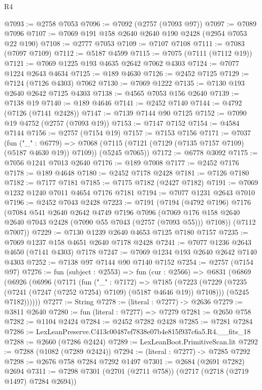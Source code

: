 \begin{lexlean}{R4}
\begin{coremodule}
@7093 := @2758 @7053
@7096 := @7092 (@2757 (@7093 @97))
@7097 := @7089 @7096
@7107 := @7069 @191 @158 @2640 @2640 @190 @2428 (@2954 @7053 @22 @190)
@7108 := @2777 @7053
@7109 := @7107 @7108
@7111 := @7083 (@7097 @7109)
@7112 := @5187 @4599
@7115 := @7075 (@7111 (@7112 @19))
@7121 := @7069 @1225 @193 @4635 @2642 @7062 @4303
@7124 := @7077 @1224 @2643 @4634
@7125 := @189 @4630
@7126 := @2452 @7125
@7129 := @7124 (@7126 @4303) @7062
@7130 := @7069 @1222
@7135 := @7130 @193 @2640 @2642 @7125 @4303
@7138 := @4565 @7053 @156 @2640
@7139 := @7138 @19
@7140 := @189 @4646
@7141 := @2452 @7140
@7144 := @4792 (@7126 (@7141 @2428))
@7147 := @7139 @7144 @90 @7125
@7152 := @7090 @19 @4752 (@2757 (@7093 @19))
@7153 := @7147 @7152
@7154 := @4584 @7144
@7156 := @2757 (@7154 @19)
@7157 := @7153 @7156
@7171 := @7037
    (fun ("_" : @6779) =>
    @7068 (@7115 (@7121 (@7129 (@7135 @7157 @7109) (@5187 @4630 @19)) @7109)) (@5245 @7065))
@7172 := @6778 @3092
@7175 := @7056 @1241 @7013 @2640
@7176 := @189 @7008
@7177 := @2452 @7176
@7178 := @189 @4648
@7180 := @2452 @7178 @2428
@7181 := @7126 @7180
@7182 := @7177 @7181
@7185 := @7175 @7182 (@2427 @7182)
@7191 := @7069 @1232 @1240 @7011 @4654 @7176 @7181
@7194 := @7077 @1231 @2643 @7010
@7196 := @2452 @7043 @2428
@7223 := @7191
    (@7194
      (@4792 @7196)
      @7176
      (@7084
        @541
        @2640
        @2642
        @4749
        @7196
        @7096
        (@7069 @176 @158 @2640 @2640 @7043 @2428 (@7090 @55 @7043 (@2757 (@7093 @55))) @7108))
      (@7112 @7007))
@7229 := @7130 @1239 @2640 @4653 @7125 @7180 @7157
@7235 := @7069 @1237 @158 @4651 @2640 @7178 @2428
@7241 := @7077 @1236 @2643 @4650 (@7141 @4303) @7178
@7247 := @7069 @1234 @193 @2640 @2642 @7140 @4303
@7252 := @7138 @97 @7144 @90 @7140 @7152
@7254 := @2757 (@7154 @97)
@7276 := fun (subject : @2553) =>
  fun (cur : @2566) =>
  @6831
    (@6869
      (@6926
        (@6996
          (@7171
            (fun ("_" : @7172) =>
            @7185
              (@7223 (@7229 (@7235 (@7241 (@7247 (@7252 @7254) @7109) (@5187 @4646 @19)) @7108)))
              (@5245 @7182))))))
@7277 := String
@7278 := (literal : @7277) -> @2636
@7279 := @3811 @2640
@7280 := fun (literal : @7277) => @7279
@7281 := @2650 @758
@7282 := @1104 @2424
@7284 := @2452 @7282 @2428
@7285 := @7281 @7284
@7286 := LexLeanPreserve.C413c00487ef7838e07b4e815f937c6a5.R4.__fits_18
@7288 := @2660 (@7286 @2424)
@7289 := LexLeanBoot.PrimitiveScan.lit
@7292 := @7288 (@1082 (@7289 @2424))
@7294 := (literal : @7277) -> @7285 @7292
@7298 := @2676 @758 @7284 @7292 @1497
@7301 := @2684 (@2691 @7282) @2694
@7311 := @7298 @7301 (@2701 (@2711 @758)) (@2717 (@2718 (@2719 @1497) @7284 @2694))

\end{coremodule}
\end{lexlean}
